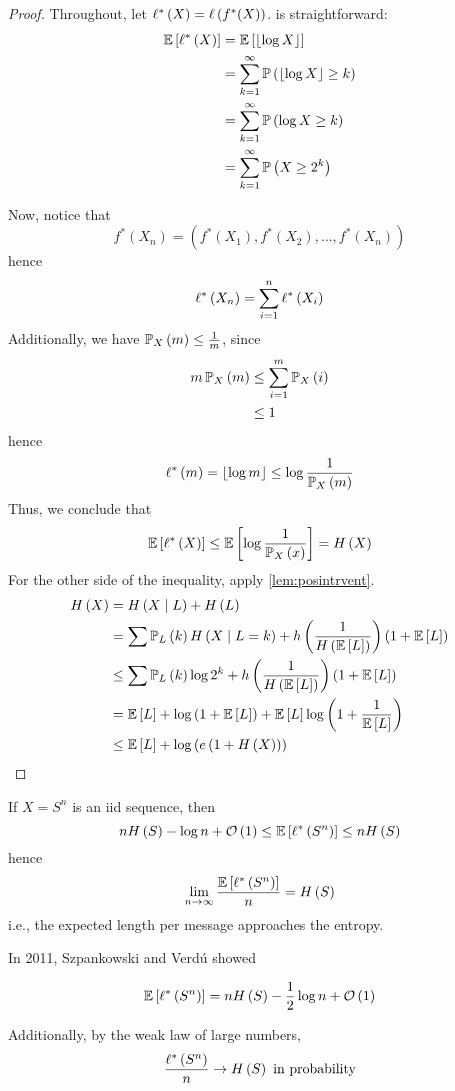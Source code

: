 \begin{proof}
    Throughout, let $\ell^*\left(X\right) = \ell\left(f^*(X)\right)$. 
    is straightforward:
    \begin{align*}\expectation{\optlength{X}}
         & = \expectation{\floor{\log{X}}}                    \\
         & = \sum_{k=1}^{\infty}\prob{\floor{\log{X}} \geq k} \\
         & = \sum_{k=1}^{\infty}\prob{\log{X} \geq k}         \\
         & = \sum_{k=1}^{\infty}\prob{X \geq 2^k}
    \end{align*}

    Now, notice that
    \[f^*(X_n) = \left(f^*(X_1), f^*(X_2), \dots, f^*(X_n)\right)\]
    hence
    \[\ell^*\left(X_n\right) = \sum_{i=1}^n\ell^*\left(X_i\right)\]
    Additionally, we have $\prob[X]{m} \leq \frac{1}{m}$, since
    \begin{align*}m\prob[X]{m}
         & \leq \sum_{i = 1}^m\prob[X]{i} \\
         & \leq 1
    \end{align*}
    hence
    \[\optlength{m} = \floor{\log{m}} \leq \log\frac{1}{\prob[X]{m}}\]
    Thus, we conclude that
    \[\expectation{\optlength{X}} \leq \expectation{\log\frac{1}{\prob[X]{x}}} = \entropy{X}\]
    For the other side of the inequality, apply \cref{lem:posintrvent}.
    \begin{align*}\entropy{X}
         & = \entropy{X \given L} + \entropy{L}                                                                                          \\
         & = \sum \prob[L]{k}\entropy{X \given L = k} + \binentropy{\frac{1}{\entropy{\expectation{L}}}}\left(1 + \expectation{L}\right) \\
         & \leq \sum \prob[L]{k}\log{2^k} + \binentropy{\frac{1}{\entropy{\expectation{L}}}}\left(1 + \expectation{L}\right)             \\
         & = \expectation{L} + \log\left(1 + \expectation{L}\right) + \expectation{L}\log\left(1 + \frac{1}{\expectation{L}}\right)      \\
         & \leq \expectation{L} + \log\left(e\left(1 + \entropy{X}\right)\right)\qedhere
    \end{align*}
\end{proof}

\begin{corollary}
    If $X = S^n$ is an iid sequence, then
    \[n\entropy{S} - \log{n} + \bigO{1} \leq \expectation{\optlength{S^n}} \leq n\entropy{S}\]
    hence
    \[\lim_{n\to\infty}\frac{\expectation{\optlength{S^n}}}{n} = \entropy{S}\]
    i.e., the expected length per message approaches the entropy.
\end{corollary}

In 2011, Szpankowski and Verd\'{u} showed

\[\expectation{\optlength{S^n}} = n\entropy{S} - \frac{1}{2}\log{n} + \bigO{1}\]

Additionally, by the weak law of large numbers,
\[\frac{\ell^*\left(S^n\right)}{n} \to H\left(S\right) \hbox{ in probability}\]
